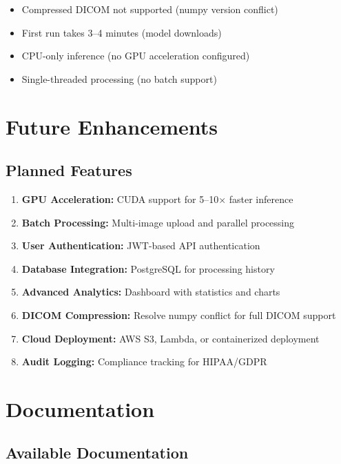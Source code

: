 \documentclass[12pt,a4paper]{article}
\begin{document}
\begin{itemize}[leftmargin=1.2cm]
    \item Compressed DICOM not supported (numpy version conflict)
    \item First run takes 3–4 minutes (model downloads)
    \item CPU-only inference (no GPU acceleration configured)
    \item Single-threaded processing (no batch support)
\end{itemize}

\section{Future Enhancements}

\subsection{Planned Features}

\begin{enumerate}[leftmargin=1.2cm]
    \item \textbf{GPU Acceleration:} CUDA support for 5–10× faster inference
    \item \textbf{Batch Processing:} Multi-image upload and parallel processing
    \item \textbf{User Authentication:} JWT-based API authentication
    \item \textbf{Database Integration:} PostgreSQL for processing history
    \item \textbf{Advanced Analytics:} Dashboard with statistics and charts
    \item \textbf{DICOM Compression:} Resolve numpy conflict for full DICOM support
    \item \textbf{Cloud Deployment:} AWS S3, Lambda, or containerized deployment
    \item \textbf{Audit Logging:} Compliance tracking for HIPAA/GDPR
\end{enumerate}

\section{Documentation}

\subsection{Available Documentation}
\end{document}
